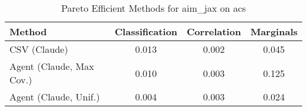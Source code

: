 \begin{table}[t!]
    \centering
    \caption{Pareto Efficient Methods for aim_jax on acs}
    \label{tab:pareto_efficient_methods_aim_jax_acs}
    \begin{tabular}{lccc}
    \toprule
    Method & Classification & Correlation & Marginals \\
    \midrule
    CSV (Claude) & \cellcolor{bronze!30}0.013 & \cellcolor{gold!30}0.002 & \cellcolor{silver!30}0.045 \\
    Agent (Claude, Max Cov.) & \cellcolor{silver!30}0.010 & \cellcolor{silver!30}0.003 & \cellcolor{bronze!30}0.125 \\
    Agent (Claude, Unif.) & \cellcolor{gold!30}0.004 & \cellcolor{bronze!30}0.003 & \cellcolor{gold!30}0.024 \\
    \bottomrule
    \end{tabular}
\end{table}